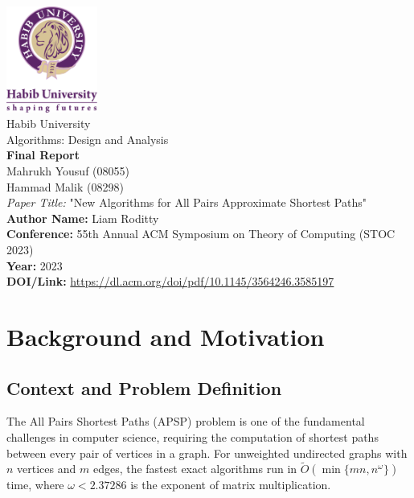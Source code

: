 \documentclass[a4paper,11pt,oneside]{book}
\begin{document}
\begin{titlepage}      
    \begin{center}
        \includegraphics[width=3cm]{figures/logo.png}\\[1.0cm]
        {\LARGE Habib University\\[0.5cm]
        Algorithms: Design and Analysis}\\[1cm]
        
        \linespread{0.1}\huge {
            \textbf{Final Report} 
        }
        \linespread{1}~\\[2cm]
        {\Large 
            Mahrukh Yousuf (08055) \\ 
            Hammad Malik (08298)
        }\\[1cm] 
        
        {\large 
            \emph{Paper Title:} "New Algorithms for All Pairs Approximate Shortest Paths"}\\[1cm] 
            
        \large \textbf{Author Name:} Liam Roditty \\ 
        \textbf{Conference:} 55th Annual ACM Symposium on Theory of Computing (STOC 2023)\\
        \textbf{Year:} 2023\\
        \textbf{DOI/Link:} \url{https://dl.acm.org/doi/pdf/10.1145/3564246.3585197}
    \end{center}
\end{titlepage}

\setcounter{chapter}{1}

\section{Background and Motivation}
\subsection{Context and Problem Definition}
The All Pairs Shortest Paths (APSP) problem is one of the fundamental challenges in computer science, requiring the computation of shortest paths between every pair of vertices in a graph. For unweighted undirected graphs with $n$ vertices and $m$ edges, the fastest exact algorithms run in $\tilde{O}(\min\{mn, n^{\omega}\})$ time, where $\omega < 2.37286$ is the exponent of matrix multiplication.\\
\end{document}
